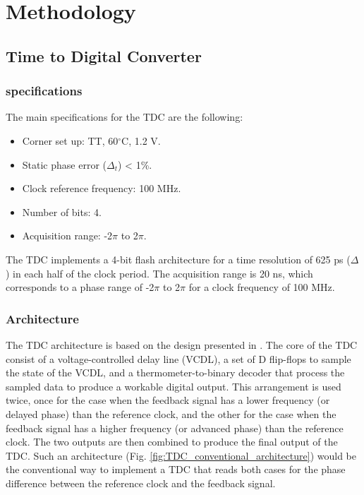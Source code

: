 \chapter{Methodology}
\section{Time to Digital Converter}

\subsection{specifications}
The main specifications for the TDC are the following:
\begin{itemize}
    \item Corner set up: TT, 60$^{\circ}$C, 1.2 V.
    \item Static phase error ($\Delta_t$) < 1\%.
    \item Clock reference frequency: 100 MHz.
    \item Number of bits: 4.
    \item Acquisition range: -2$\pi$ to 2$\pi$.
\end{itemize}

The TDC implements a 4-bit flash architecture for a time resolution of 625 ps ($\Delta$) in each half of the clock period. The acquisition range is 20 ns, which corresponds to a phase 
range of -2$\pi$ to 2$\pi$ for a clock frequency of 100 MHz.

\subsection{Architecture}
The TDC architecture is based on the design presented in \cite{bib:tdc_flash}. The core of the TDC consist of a voltage-controlled delay line (VCDL), a set of D flip-flops to sample the
state of the VCDL, and a thermometer-to-binary decoder that process the sampled data to produce a workable digital output. This arrangement is used twice, once for the case when the
feedback signal has a lower frequency (or delayed phase) than the reference clock, and the other for the case when the feedback signal has a higher frequency (or advanced phase) than
the reference clock. The two outputs are then combined to produce the final output of the TDC. Such an architecture (Fig. \ref{fig:TDC_conventional_architecture}) would be the 
conventional way to implement a TDC that reads both cases for the phase difference between the reference clock and the feedback signal. 

